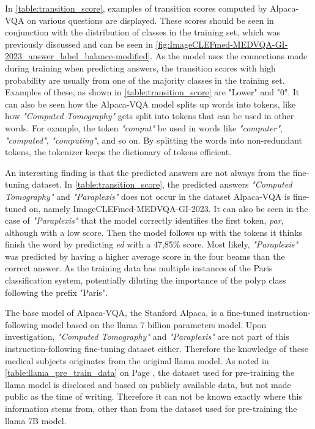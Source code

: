     In \autoref{table:transition_score}, examples of transition scores computed by Alpaca-VQA on various questions are displayed.
    These scores should be seen in conjunction with the distribution of classes in the training set, which was previously discussed and can be seen in \autoref{fig:ImageCLEFmed-MEDVQA-GI-2023_answer_label_balance-modified}. 
    As the model uses the connections made during training when predicting answers, the transition scores with high probability are usually from one of the majority classes in the training set. Examples of these, as shown in \autoref{table:transition_score} are "Lower" and "0". 
    It can also be seen how the Alpaca-VQA model splits up words into tokens, like how \textit{"Computed Tomography"} gets split into tokens that can be used in other words. For example, the token \textit{"comput"} be used in words like \textit{"computer"}, \textit{"computed"}, \textit{"computing"}, and so on. By splitting the words into non-redundant tokens, the tokenizer keeps the dictionary of tokens efficient. 

    An interesting finding is that the predicted answers are not always from the fine-tuning dataset. In \autoref{table:transition_score}, the predicted answers \textit{"Computed Tomography"} and \textit{"Paraplexis"} does not occur in the dataset Alpaca-VQA is fine-tuned on, namely ImageCLEFmed-MEDVQA-GI-2023. 
    It can also be seen in the case of \textit{"Paraplexis"} that the model correctly identifies the first token, \textit{par}, although with a low score. Then the model follows up with the tokens it thinks finish the word by predicting \textit{ed} with a 47,85\% score. Most likely, \textit{"Paraplexis"} was predicted by having a higher average score in the four beams than the correct answer. As the training data has multiple instances of the Paris classification system, potentially diluting the importance of the polyp class following the prefix "Paris".
    
    The base model of Alpaca-VQA, the Stanford Alpaca, is a fine-tuned instruction-following model based on the \gls{llama} 7 billion parameters model. Upon investigation, \textit{"Computed Tomography"} and \textit{"Paraplexis"} are not part of this instruction-following fine-tuning dataset either. Therefore the knowledge of these medical subjects originates from the original \gls{llama} model. As noted in \autoref{table:llama_pre_train_data} on Page \pageref{table:llama_pre_train_data}, the dataset used for pre-training the \gls{llama} model is disclosed and based on publicly available data, but not made public as the time of writing. Therefore it can not be known exactly where this information stems from, other than from the dataset used for pre-training the \gls{llama} 7B model.


